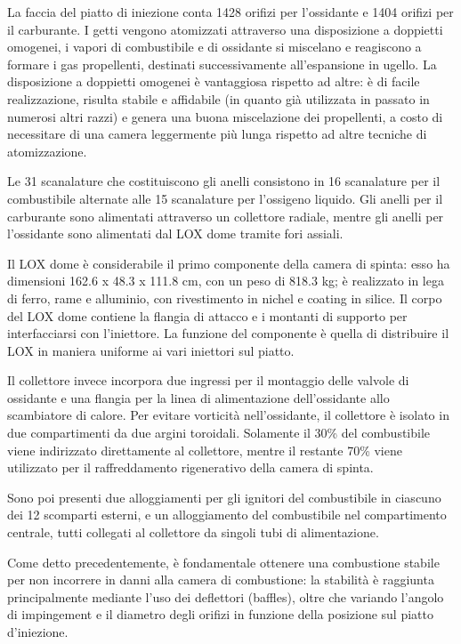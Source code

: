La faccia del piatto di iniezione conta 1428 orifizi per l’ossidante e 1404 orifizi per il carburante. I getti vengono atomizzati attraverso una disposizione a doppietti omogenei, i vapori di combustibile e di ossidante si miscelano e reagiscono a formare i gas propellenti, destinati successivamente all’espansione in ugello. La disposizione a doppietti omogenei è vantaggiosa rispetto ad altre: è di facile realizzazione, risulta stabile e affidabile (in quanto già utilizzata in passato in numerosi altri razzi) e genera una buona miscelazione dei propellenti, a costo di necessitare di una camera leggermente più lunga rispetto ad altre tecniche di atomizzazione.

Le 31 scanalature che costituiscono gli anelli consistono in 16 scanalature per il combustibile alternate alle 15 scanalature per l’ossigeno liquido. Gli anelli per il carburante sono alimentati attraverso un collettore radiale, mentre gli anelli per l’ossidante sono alimentati dal LOX dome tramite fori assiali.

Il LOX dome è considerabile il primo componente della camera di spinta: esso ha dimensioni 162.6 x 48.3 x 111.8 cm, con un peso di 818.3 kg; è realizzato in lega di ferro, rame e alluminio, con rivestimento in nichel e coating in silice. Il corpo del LOX dome contiene la flangia di attacco e i montanti di supporto per interfacciarsi con l’iniettore. La funzione del componente è quella di distribuire il LOX in maniera uniforme ai vari iniettori sul piatto.

Il collettore invece incorpora due ingressi per il montaggio delle valvole di ossidante e una flangia per la linea di alimentazione dell’ossidante allo scambiatore di calore. Per evitare vorticità nell’ossidante, il collettore è isolato in due compartimenti da due argini toroidali. Solamente il 30\% del combustibile viene indirizzato direttamente al collettore, mentre il restante 70\% viene utilizzato per il raffreddamento rigenerativo della camera di spinta.

Sono poi presenti due alloggiamenti per gli ignitori del combustibile in ciascuno dei 12 scomparti esterni, e un alloggiamento del combustibile nel compartimento centrale, tutti collegati al collettore da singoli tubi di alimentazione.

Come detto precedentemente, è fondamentale ottenere una combustione stabile per non incorrere in danni alla camera di combustione: la stabilità è raggiunta principalmente mediante l’uso dei deflettori (baffles), oltre che variando l’angolo di impingement e il diametro degli orifizi in funzione della posizione sul piatto d’iniezione.

